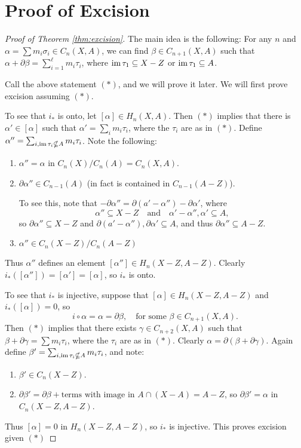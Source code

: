 \section{Proof of Excision}
\begin{proof}[Proof of Theorem \ref{thm:excision}]
  The main idea is the following: For any
  $n$ and
  $\alpha = \sum m_i \sigma_i \in C_n(X, A)$, we can find
  $\beta \in C_{n + 1}(X, A)$ such that
  $\alpha + \partial \beta = \sum_{i = 1}^\ell m_i \tau_i$,
  where $\operatorname{im} \tau_1 \subseteq X - Z$ or
  $\operatorname{im} \tau_1 \subseteq A$.

  Call the above statement
  $(*)$, and we will prove it later. We will first
  prove excision assuming $(*)$.

  To see that $i_*$ is onto, let
  $[\alpha] \in H_n(X, A)$. Then $(*)$ implies that there
  is $\alpha' \in [\alpha]$ such that
  $\alpha' = \sum_i m_i \tau_i$, where
  the $\tau_i$ are as in $(*)$. Define
  $\alpha'' = \sum_{i, \operatorname{im} \tau_i \nsubseteq A} m_i \tau_i$.
  Note the following:
  \begin{enumerate}
    \item $\alpha'' = \alpha$ in
      $C_n(X) / C_n(A) = C_n(X, A)$.
    \item $\partial \alpha'' \in C_{n - 1}(A)$ (in
      fact is contained in $C_{n - 1}(A - Z)$).

      To see this, note that
      $- \partial \alpha'' = \partial(a' - \alpha'') - \partial \alpha'$, where
      \[
        \alpha'' \subseteq X - Z \quad \text{and} \quad
        \alpha' - \alpha'', \alpha' \subseteq A,
      \]
      so
      $\partial \alpha'' \subseteq X - Z$ and
      $\partial(a' - \alpha''), \partial \alpha' \subseteq A$,
      and thus $\partial \alpha'' \subseteq A - Z$.
    \item $\alpha'' \in C_n(X - Z) / C_n(A - Z)$
  \end{enumerate}
  Thus $\alpha''$ defines an element
  $[\alpha''] \in H_n(X - Z, A - Z)$.
  Clearly
  $i_*([\alpha'']) = [\alpha'] = [\alpha]$, so
  $i_*$ is onto.

  To see that $i_*$ is injective, suppose that
  $[\alpha] \in H_n(X - Z, A - Z)$ and
  $i_*([\alpha]) = 0$, so
  \[
    i \circ \alpha = \alpha = \partial \beta, \quad
    \text{for some $\beta \in C_{n + 1}(X, A)$}.
  \]
  Then $(*)$ implies that there exists
  $\gamma \in C_{n + 2}(X, A)$ such that
  $\beta + \partial \gamma = \sum m_i \tau_i$, where
  the $\tau_i$ are as in $(*)$. Clearly
  $\alpha = \partial(\beta + \partial \gamma)$.
  Again define $\beta' = \sum_{i, \operatorname{im} \tau_i \nsubseteq A} m_i \tau_i$, and
  note:
  \begin{enumerate}
    \item $\beta' \in C_n(X - Z)$.
    \item $\partial \beta' = \partial \beta + \text{terms with image in $A \cap (X - A) = A - Z$}$, so
      $\partial \beta' = \alpha$ in $C_n(X - Z, A - Z)$.
  \end{enumerate}
  Thus $[\alpha] = 0$ in $H_n(X - Z, A - Z)$, so
  $i_*$ is injective. This proves excision given $(*)$


\end{proof}
